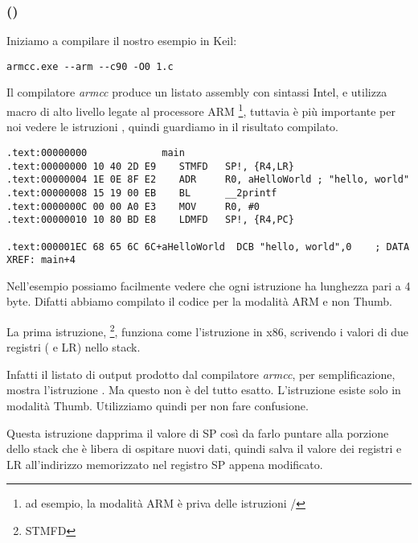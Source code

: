 \subsubsection{\NonOptimizingKeilVI (\ARMMode)}

Iniziamo a compilare il nostro esempio in Keil:

\begin{lstlisting}
armcc.exe --arm --c90 -O0 1.c
\end{lstlisting}

\myindex{\IntelSyntax}
Il compilatore \emph{armcc} produce un listato assembly con sintassi Intel,
e utilizza macro di alto livello legate al processore ARM
\footnote{ad esempio, la modalità ARM è priva delle istruzioni \PUSH/\POP},
tuttavia è più importante per noi vedere le istruzioni , quindi guardiamo in \IDA il risultato compilato.

\begin{lstlisting}[caption=\NonOptimizingKeilVI (\ARMMode) \IDA,style=customasmARM]
.text:00000000             main
.text:00000000 10 40 2D E9    STMFD   SP!, {R4,LR}
.text:00000004 1E 0E 8F E2    ADR     R0, aHelloWorld ; "hello, world"
.text:00000008 15 19 00 EB    BL      __2printf
.text:0000000C 00 00 A0 E3    MOV     R0, #0
.text:00000010 10 80 BD E8    LDMFD   SP!, {R4,PC}

.text:000001EC 68 65 6C 6C+aHelloWorld  DCB "hello, world",0    ; DATA XREF: main+4
\end{lstlisting}

Nell'esempio possiamo facilmente vedere che ogni istruzione ha lunghezza pari a 4 byte.
Difatti abbiamo compilato il codice per la modalità ARM e non Thumb.

La prima istruzione, \footnote{\ac{STMFD}},
funziona come l'istruzione \PUSH in x86, scrivendo i valori di due registri ( e \ac{LR}) nello stack.

Infatti il listato di output prodotto dal compilatore \emph{armcc}, per semplificazione, mostra l'istruzione .
Ma questo non è del tutto esatto. L'istruzione \PUSH esiste solo in modalità Thumb.
Utilizziamo quindi \IDA per non fare confusione.

Questa istruzione dapprima  il valore di \ac{SP} così da farlo puntare alla porzione dello stack che è libera di ospitare nuovi dati,
quindi salva il valore dei registri  e \ac{LR} all'indirizzo memorizzato
nel registro \ac{SP} appena modificato.

